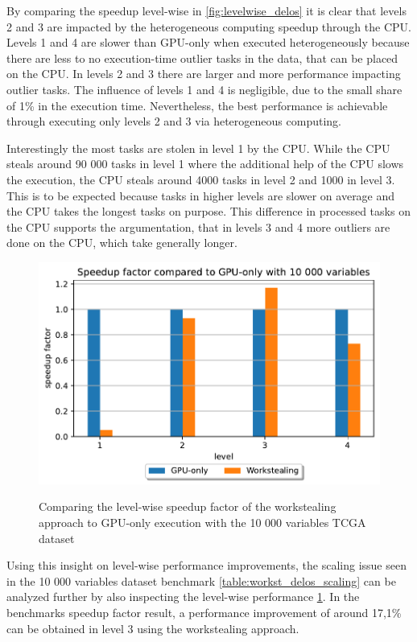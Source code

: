 By comparing the speedup level-wise in \ref{fig:levelwise_delos} it is clear that levels 2 and 3 are impacted by the heterogeneous computing speedup through the CPU. Levels 1 and 4 are slower than GPU-only when executed heterogeneously because there are less to no execution-time outlier tasks in the data, that can be placed on the CPU. In levels 2 and 3 there are larger and more performance impacting outlier tasks. The influence of levels 1 and 4 is negligible, due to the small share of 1\% in the execution time. Nevertheless, the best performance is achievable through executing only levels 2 and 3 via heterogeneous computing.

Interestingly the most tasks are stolen in level 1 by the CPU. While the CPU steals around 90 000 tasks in level 1 where the additional help of the CPU slows the execution, the CPU steals around 4000 tasks in level 2 and 1000 in level 3. This is to be expected because tasks in higher levels are slower on average and the CPU takes the longest tasks on purpose. This difference in processed tasks on the CPU supports the argumentation, that in levels 3 and 4 more outliers are done on the CPU, which take generally longer.

\begin{figure}[H]
  \caption{Comparing the level-wise speedup factor of the workstealing approach to GPU-only execution with the 10 000 variables TCGA dataset}
  \includegraphics[width=\textwidth]{figures/levelwise_scaled.pdf}
  \centering
  \label{fig:levelwise_scaled_delos}
\end{figure}


Using this insight on level-wise performance improvements, the scaling issue seen in the 10 000 variables dataset benchmark \ref{table:workst_delos_scaling} can be analyzed further by also inspecting the level-wise performance \ref{fig:levelwise_scaled_delos}. In the benchmarks speedup factor result, a performance improvement of around 17,1\% can be obtained in level 3 using the workstealing approach.


